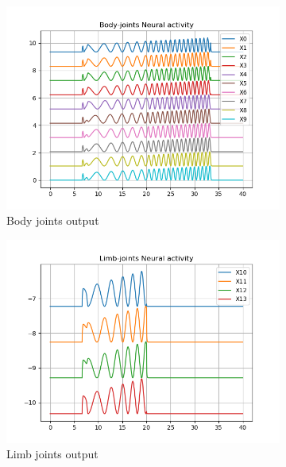 \documentclass{cmc}
\begin{document}
\begin{figure}[H] 
  \begin{subfigure}[b]{0.5\linewidth}
    \centering
    \includegraphics[width=1\linewidth]{figures/Figure_3.png} 
    \caption{Body joints output} 
    \label{fig:oscillation:a} 
  \end{subfigure}%
  \begin{subfigure}[b]{0.5\linewidth}
    \centering
    \includegraphics[width=1\linewidth]{figures/Figure_4.png} 
    \caption{Limb joints output} 
    \label{fig:oscillation:b} 
  \end{subfigure} 
  \begin{subfigure}[b]{0.5\linewidth}
    \centering

\end{subfigure}
\end{figure}
\end{document}
